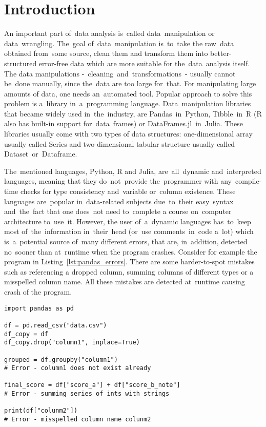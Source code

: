 \chapter*{Introduction}

An important part of~data analysis is~called data~manipulation or data~wrangling.
The~goal of~data~manipulation is~to~take the raw~data obtained from~some source, clean them and transform them into
better-structured error-free data which are more suitable for the~data~analysis itself.
The data manipulations -~cleaning~and~transformations~- usually cannot be~done manually, since the~data are too large
for~that.
For manipulating large amounts of data, one needs an~automated tool.
Popular approach to solve this problem is a~library in~a~programming language.
Data~manipulation libraries that became widely used in~the~industry, are Pandas~in~Python\cite{pandas_docs},
Tibble~in~R\cite{tibble} (R also has built-in
support for~data~frames\cite{R-base}) or DataFrames.jl~in~Julia\cite{DataFrames.jl}.
These libraries usually come with two types of data structures: one-dimensional array usually called Series
and two-dimensional tabular structure usually called Dataset~or~Dataframe.

The~mentioned languages, Python, R and Julia, are~all~dynamic and~interpreted languages, meaning that they do~not~provide
the~programmer with any~compile-time checks for type consistency and~variable or~column existence.
These languages are~popular in~data-related subjects due~to~their easy~syntax and~the~fact that
one does~not need to~complete a course on~computer architecture to~use~it.
However, the user of~a~dynamic languages has~to~keep most of~the~information in~their~head (or~use comments~in~code a~lot)
which is~a~potential source of~many different errors, that are, in~addition, detected no~sooner than at~runtime when
the program crashes.
Consider for example the program in Listing~\ref{lst:pandas_errors}.
There are some harder-to-spot mistakes such as referencing a dropped column, summing columns of different types
or a misspelled column name.
All these mistakes are detected at~runtime causing crash of the program.

\begin{lstlisting}[caption=Pandas code with errors, label={lst:pandas_errors}, captionpos=b]
import pandas as pd

df = pd.read_csv("data.csv")
df_copy = df
df_copy.drop("column1", inplace=True)

grouped = df.groupby("column1")
# Error - column1 does not exist already

final_score = df["score_a"] + df["score_b_note"]
# Error - summing series of ints with strings

print(df["colunm2"])
# Error - misspelled column name colunm2

\end{lstlisting}

